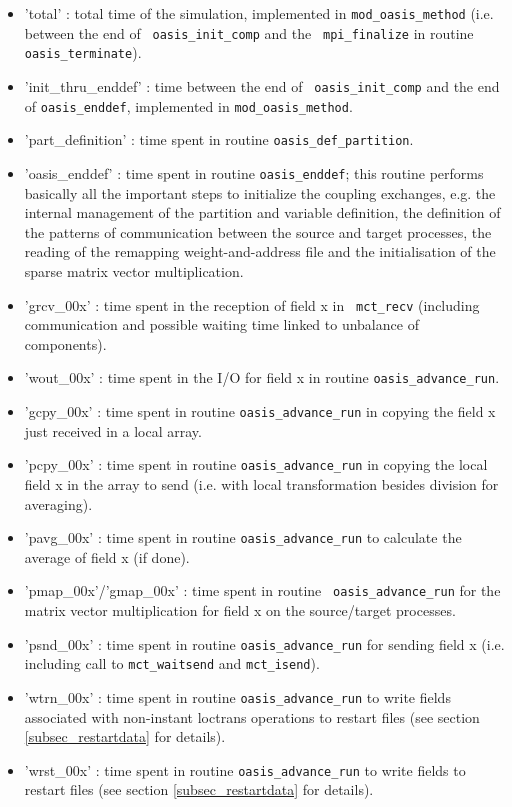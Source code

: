\begin{itemize}

\item {'total'} : total time of the simulation, implemented
  in {\tt mod\_oasis\_method} (i.e. between the end of {\tt
    oasis\_init\_comp} and the {\tt
    mpi\_finalize} in routine {\tt oasis\_terminate}).

\item {'init\_thru\_enddef'} : time between the end of {\tt
    oasis\_init\_comp} and the end of {\tt oasis\_enddef}, implemented
  in {\tt mod\_oasis\_method}.

\item {'part\_definition'} : time spent in routine {\tt oasis\_def\_partition}.

\item {'oasis\_enddef'} : time spent in 
  routine {\tt oasis\_enddef}; this routine performs basically all the
  important steps to initialize the coupling exchanges, e.g. the
  internal management of the partition and variable definition, the
  definition of the patterns of communication between the source and
  target processes, the reading of the remapping weight-and-address
  file and the initialisation of the sparse matrix vector multiplication.
\item {'grcv\_00x'} : time spent in the reception of field x in {\tt
    mct\_recv} (including communication and possible waiting time
  linked to unbalance of components).
\item {'wout\_00x'} : time spent in the I/O for field x in routine
  {\tt oasis\_advance\_run}.
\item {'gcpy\_00x'} : time spent in routine {\tt oasis\_advance\_run}
  in copying the field x just received in a local array.
\item {'pcpy\_00x'} : time spent in routine {\tt oasis\_advance\_run}
  in copying the local field x in the array to send (i.e. with local
  transformation besides division for averaging).
\item {'pavg\_00x'} : time spent in routine {\tt oasis\_advance\_run}
  to calculate the average of field x (if done).
\item {'pmap\_00x'/'gmap\_00x'} : time spent in routine {\tt
    oasis\_advance\_run} for the matrix vector multiplication for
  field x on the source/target processes.
\item {'psnd\_00x'} : time spent in routine {\tt oasis\_advance\_run}
  for sending field x (i.e. including call to {\tt mct\_waitsend} and
  {\tt mct\_isend}).
\item {'wtrn\_00x'} : time spent in routine {\tt oasis\_advance\_run}
  to write fields associated with non-instant loctrans operations to
  restart files  (see section \ref{subsec_restartdata} for details).
\item {'wrst\_00x'} : time spent in routine {\tt oasis\_advance\_run}
  to write fields to
  restart files (see section \ref{subsec_restartdata} for details).
\end{itemize}

